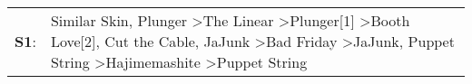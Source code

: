\begin{supertabular}{p{0.03\textwidth}p{0.92\textwidth}}
 \textbf{S1}:  &  Similar Skin\textsuperscript{}, \enspace Plunger\textsuperscript{} \textgreater \enspace The Linear\textsuperscript{} \textgreater \enspace Plunger[1]\textsuperscript{} \textgreater \enspace Booth Love[2]\textsuperscript{}, \enspace Cut the Cable\textsuperscript{}, \enspace JaJunk\textsuperscript{} \textgreater \enspace Bad Friday\textsuperscript{} \textgreater \enspace JaJunk\textsuperscript{}, \enspace Puppet String\textsuperscript{} \textgreater \enspace Hajimemashite\textsuperscript{} \textgreater \enspace Puppet String\textsuperscript{}  \enspace  \\
\end{supertabular}
